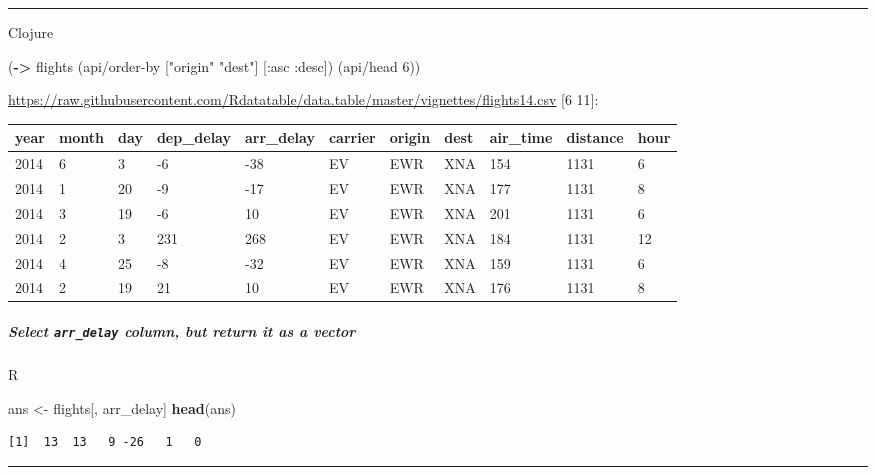 \documentclass[]{article}
\newenvironment{Shaded}{\begin{snugshade}}{\end{snugshade}}
\newcommand{\KeywordTok}[1]{\textcolor[rgb]{0.13,0.29,0.53}{\textbf{#1}}}
\newcommand{\DecValTok}[1]{\textcolor[rgb]{0.00,0.00,0.81}{#1}}
\newcommand{\StringTok}[1]{\textcolor[rgb]{0.31,0.60,0.02}{#1}}
\newcommand{\AttributeTok}[1]{\textcolor[rgb]{0.77,0.63,0.00}{#1}}
\newcommand{\NormalTok}[1]{#1}
\let\oldsubparagraph\subparagraph
\renewcommand{\subparagraph}[1]{\oldsubparagraph{#1}\mbox{}}
\begin{document}
\begin{center}\rule{0.5\linewidth}{0.5pt}\end{center}

Clojure

\begin{Shaded}
\begin{Highlighting}[]
\NormalTok{(}\KeywordTok{->}\NormalTok{ flights}
\NormalTok{    (api/order-by [}\StringTok{"origin"} \StringTok{"dest"}\NormalTok{] [}\AttributeTok{:asc} \AttributeTok{:desc}\NormalTok{])}
\NormalTok{    (api/head }\DecValTok{6}\NormalTok{))}
\end{Highlighting}
\end{Shaded}

\url{https://raw.githubusercontent.com/Rdatatable/data.table/master/vignettes/flights14.csv}
{[}6 11{]}:

\begin{longtable}[]{@{}lllllllllll@{}}
\toprule
year & month & day & dep\_delay & arr\_delay & carrier & origin & dest &
air\_time & distance & hour\tabularnewline
\midrule
\endhead
2014 & 6 & 3 & -6 & -38 & EV & EWR & XNA & 154 & 1131 & 6\tabularnewline
2014 & 1 & 20 & -9 & -17 & EV & EWR & XNA & 177 & 1131 &
8\tabularnewline
2014 & 3 & 19 & -6 & 10 & EV & EWR & XNA & 201 & 1131 & 6\tabularnewline
2014 & 2 & 3 & 231 & 268 & EV & EWR & XNA & 184 & 1131 &
12\tabularnewline
2014 & 4 & 25 & -8 & -32 & EV & EWR & XNA & 159 & 1131 &
6\tabularnewline
2014 & 2 & 19 & 21 & 10 & EV & EWR & XNA & 176 & 1131 & 8\tabularnewline
\bottomrule
\end{longtable}

\subparagraph{\texorpdfstring{Select \texttt{arr\_delay} column, but
return it as a
vector}{Select arr\_delay column, but return it as a vector}}\label{select-arr_delay-column-but-return-it-as-a-vector}

R

\begin{Shaded}
\begin{Highlighting}[]
\NormalTok{ans <-}\StringTok{ }\NormalTok{flights[, arr_delay]}
\KeywordTok{head}\NormalTok{(ans)}
\end{Highlighting}
\end{Shaded}

\begin{verbatim}
[1]  13  13   9 -26   1   0
\end{verbatim}

\begin{center}\rule{0.5\linewidth}{0.5pt}\end{center}
\end{document}
